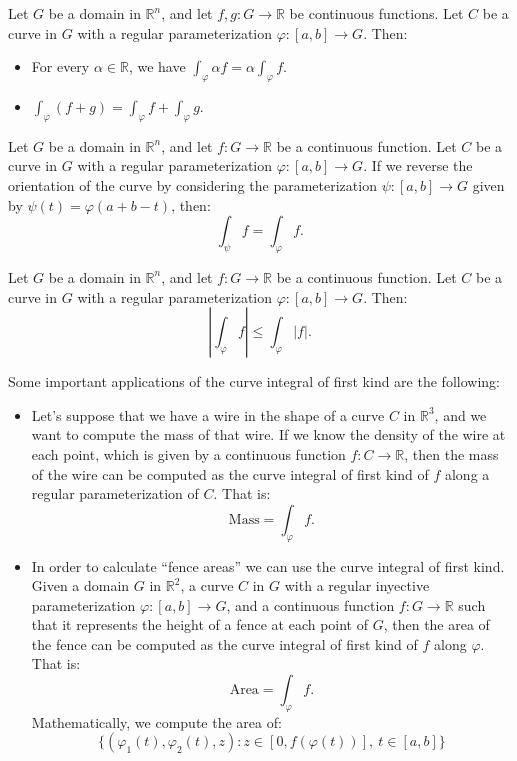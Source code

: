 \begin{prop}
    Let $G$ be a domain in $\mathbb{R}^n$, and let $f, g : G \to \mathbb{R}$ be continuous functions. Let $C$ be a curve in $G$ with a regular parameterization $\varphi : [a, b] \to G$. Then:
    \begin{itemize}
        \item For every $\alpha \in \mathbb{R}$, we have $\displaystyle \int_\varphi \alpha f = \alpha \int_\varphi f$.
        \item $\displaystyle \int_\varphi (f + g) = \int_\varphi f + \int_\varphi g$.
    \end{itemize}
\end{prop}
\begin{prop}
    Let $G$ be a domain in $\mathbb{R}^n$, and let $f : G \to \mathbb{R}$ be a continuous function. Let $C$ be a curve in $G$ with a regular parameterization $\varphi : [a, b] \to G$. If we reverse the orientation of the curve by considering the parameterization $\psi : [a, b] \to G$ given by $\psi(t) = \varphi(a + b - t)$, then:
    \[
        \int_\psi f = \int_\varphi f.
    \]
\end{prop}
\begin{prop}
    Let $G$ be a domain in $\mathbb{R}^n$, and let $f : G \to \mathbb{R}$ be a continuous function. Let $C$ be a curve in $G$ with a regular parameterization $\varphi : [a, b] \to G$. Then:
    \[
        \left|\int_\varphi f\right| \leq \int_\varphi |f|.
    \]
\end{prop}

Some important applications of the curve integral of first kind are the following:
\begin{itemize}
    \item Let's suppose that we have a wire in the shape of a curve $C$ in $\mathbb{R}^3$, and we want to compute the mass of that wire. If we know the density of the wire at each point, which is given by a continuous function $f : C \to \mathbb{R}$, then the mass of the wire can be computed as the curve integral of first kind of $f$ along a regular parameterization of $C$. That is:
    \[
        \text{Mass} = \int_\varphi f.
    \]

    \item In order to calculate ``fence areas'' we can use the curve integral of first kind. Given a domain $G$ in $\mathbb{R}^2$, a curve $C$ in $G$ with a regular inyective parameterization $\varphi : [a, b] \to G$, and a continuous function $f : G \to \mathbb{R}$ such that it represents the height of a fence at each point of $G$, then the area of the fence can be computed as the curve integral of first kind of $f$ along $\varphi$. That is:
    \[
        \text{Area} = \int_\varphi f.
    \]
    Mathematically, we compute the area of:
\[
    \{(\varphi_1(t), \varphi_2(t), z) : z\in [0, f(\varphi(t))],\ t \in [a, b]\}
\]
\end{itemize}


